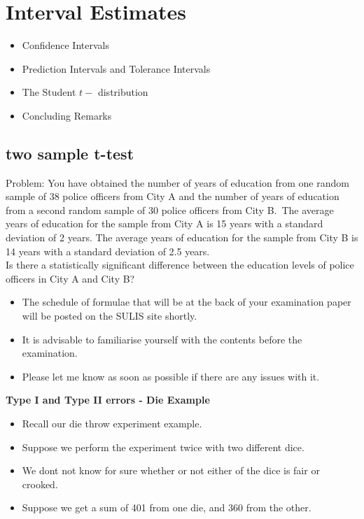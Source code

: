 \documentclass[]{report}
\begin{document}
{{\section{Interval Estimates}
\begin{itemize}
\item Confidence Intervals
\item Prediction Intervals and Tolerance Intervals
\item The Student $t-$ distribution
\item Concluding Remarks
\end{itemize}



\subsection{two sample t-test}
Problem: You have obtained the number of years of education from one random sample of 38 police 
officers from City A and the number of years of education from a second random sample of 30 police 
officers from City B.\ The average years of education for the sample from City A is 15 years with a 
standard deviation of 2 years. The average years of education for the sample from City B is 14 years with a standard deviation of 2.5 years. \\
Is there a statistically significant difference between the education levels of police officers in City A and City B?




\begin{itemize}
\item The schedule of formulae that will be at the back of your examination paper will be posted on the SULIS site shortly.
\item It is advisable to familiarise yourself with the contents before the examination.
\item Please let me know as soon as possible if there are any issues with it.
\end{itemize}




\textbf{Type I and Type II errors - Die Example}
\begin{itemize}
\item Recall our die throw experiment example. 
\item Suppose we perform the experiment twice with two different dice.
\item We dont not know for sure whether or not either of the dice is fair or crooked.
\item Suppose we get a sum of 401 from one die, and 360 from the other.
\end{itemize}

}}
\end{document}
